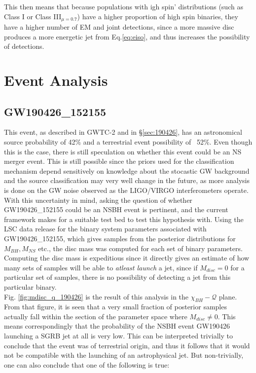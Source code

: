     This then means that because populations with igh spin' distributions (such as
    Class I or Class III$_{\mu = 0.7}$) have a higher proportion of high spin binaries,
    they have a higher number of EM and joint detections, since a more massive disc
    produces a more energetic jet from Eq.\ref{eq:eiso}, and thus increases the
    possibility of detections.

\section{Event Analysis}\label{sec:event_analysis}

    \subsection{GW190426\_152155}\label{ssec:nsbh_190426}

        This event, as described in GWTC-2 and in \S\ref{sec:190426}, has an
        astronomical source probability of 42\% and a terrestrial event possibility of
        ~52\%. Even though this is the case, there is still speculation on whether this
        event could be an NS merger event.  This is still possible since the priors used
        for the classification mechanism depend sensitively on knowledge about the
        stocastic GW background and the source classification may very well change in
        the future, as more analysis is done on the GW noise observed as the LIGO/VIRGO
        interferometers operate.\\
        With this uncertainty in mind, asking the question of whether GW190426\_152155
        could be an NSBH event is pertinent, and the current framework makes for a
        suitable test bed to test this hypothesis with. Using the LSC data release for
        the binary system parameters associated with GW190426\_152155, which gives
        samples from the posterior distributions for $M_{BH}, M_{NS}$ etc., the disc
        mass was computed for each set of binary parameters. Computing the disc mass is
        expeditious since it directly gives an estimate of how many sets of samples will
        be able to \textit{atleast launch} a jet, since if $M_{disc} = 0$ for a
        particular set of samples, there is no possibility of detecting a jet from this
        particular binary.\\
        Fig. \ref{fig:mdisc_q_190426} is the result of this analysis in the
        $\chi_{BH}-\mathcal{Q}$ plane. From that figure, it is seen that a very small
        fraction of posterior samples actually fall within the section of the parameter
        space where $M_{disc} \neq 0$. This means correspondingly that the
        probability of the NSBH event GW190426 launching a SGRB jet at all is very low.
        This can be interpreted trivially to conclude that the event was of terrestrial
        origin, and thus it follows that it would not be compatible with the launching
        of an astrophysical jet. But non-trivially, one can also conclude that one of
        the following is true:

